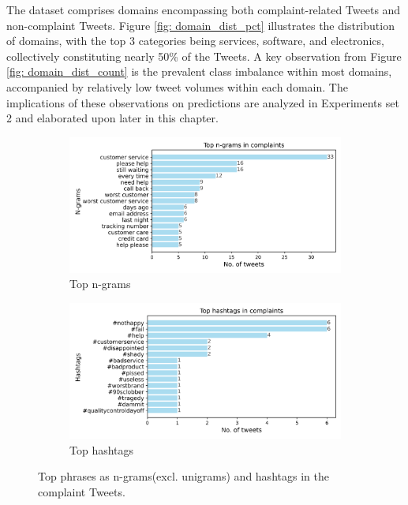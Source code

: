 The dataset comprises domains encompassing both complaint-related Tweets and non-complaint Tweets. Figure \ref{fig: domain_dist_pct} illustrates the distribution of domains, with the top 3 categories being services, software, and electronics, collectively constituting nearly 50\% of the Tweets. A key observation from Figure \ref{fig: domain_dist_count} is the prevalent class imbalance within most domains, accompanied by relatively low tweet volumes within each domain. The implications of these observations on predictions are analyzed in Experiments set 2 and elaborated upon later in this chapter.

\begin{figure}[htbp]
    \centering
    \captionsetup{font=small}
    \begin{subfigure}{0.49\textwidth}
        \centering
        \includegraphics[width=\linewidth]{figures/top_ngram_horiz_bar.png}
        \caption{Top n-grams}
        \label{fig: top_ngrams}
    \end{subfigure}
    \hfill
    \begin{subfigure}{0.49\textwidth}
        \centering
        \includegraphics[width=\linewidth]{figures/top_hash_horiz_bar.png}
        \caption{Top hashtags}
        \label{fig: top_hashtags}
    \end{subfigure}
    \caption{Top phrases as n-grams(excl. unigrams) and hashtags in the complaint Tweets.}
    \label{fig: top_ngrams_hashtags}
\end{figure}

